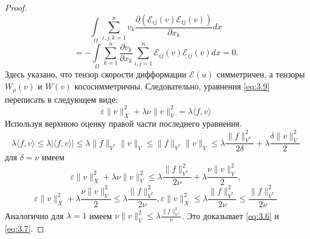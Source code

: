 \begin{proof}
$$\int\limits_{\Omega}\sum_{i,j,k=1}^n v_k\frac{\partial (\mathcal{E}_{ij}(v)\mathcal{E}_{ij}(v))}{\partial x_k}dx$$
$$=-\int\limits_{\Omega}\sum_{k=1}^n \frac{\partial v_k}{\partial x_k}\sum_{i,j=1}^n\mathcal{E}_{ij}(v)\mathcal{E}_{ij}(v)dx=0.$$
Здесь указано, что тензор скорости дифформации $\mathcal{E}(u)$ симметричен, а тензоры $W_{\rho}(v)$ и $W(v)$ кососимметричны. 
Следовательно, уравнения \ref{eq:3.9} переписать в следующем виде:
$$\varepsilon\|v\|^2_X+\lambda\nu\|v\|^2_V=\lambda\langle f,v\rangle$$
Используя верхнюю оценку правой части последнего уравнения.
$$\lambda\langle f,v\rangle\leqslant\lambda |\langle f,v\rangle|\leqslant\lambda\|f\|_{V^*}\|v\|_V\leqslant\|f\|_{V^*}\|v\|_V\leqslant
\lambda\frac{\|f\|_{V^*}^2}{2\delta}+\lambda\frac{\delta\|v\|_V^2}{2}$$
для $\delta=\nu$ имеем
$$\varepsilon\|v\|^2_X+\lambda\nu\|v\|^2_V\leqslant\lambda\frac{\|f\|^2_{V^*}}{2\nu}+\lambda\frac{\nu\|v\|^2_V}{2},$$
$$\varepsilon\|v\|^2_X+\lambda\frac{\nu\|v\|^2_V}{2}\leqslant\lambda\frac{\|f\|^2_{V^*}}{2\nu}, \varepsilon\|v\|^2_X\leqslant\lambda
\frac{\|f\|^2_{V^*}}{2\nu}\leqslant\frac{\|f\|^2_{V^*}}{2\nu}$$
Аналогично для $\lambda=1$ имеем $\nu\|v\|^2_V\leqslant\lambda\frac{\|f\|^2_{V^*}}{\nu}$. Это доказывает \ref{eq:3.6} и \ref{eq:3.7}.
\end{proof}






































































